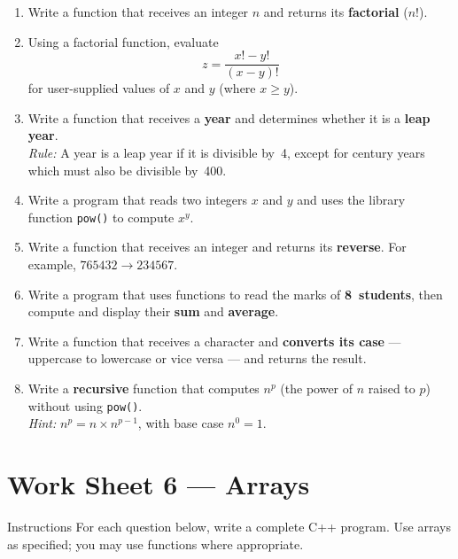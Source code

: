 \begin{enumerate}[leftmargin=*, label=\textbf{Q\arabic*.}]
\item Write a function that receives an integer $n$ and returns its
      \textbf{factorial} ($n!$).

\item Using a factorial function, evaluate
      \[
          z = \frac{x! - y!}{(x - y)!}
      \]
      for user-supplied values of $x$ and $y$ (where $x \geq y$).

\item Write a function that receives a \textbf{year} and determines
      whether it is a \textbf{leap year}.\\
      \textit{Rule:} A year is a leap year if it is divisible by~4,
      except for century years which must also be divisible by~400.

\item Write a program that reads two integers $x$ and $y$ and uses the
      library function \texttt{pow()} to compute $x^{y}$.

\item Write a function that receives an integer and returns its
      \textbf{reverse}.  For example, $765432 \rightarrow 234567$.

\item Write a program that uses functions to read the marks of
      \textbf{8~students}, then compute and display their \textbf{sum}
      and \textbf{average}.

\item Write a function that receives a character and \textbf{converts
      its case} --- uppercase to lowercase or vice versa --- and returns
      the result.

\item Write a \textbf{recursive} function that computes $n^{p}$
      (the power of $n$ raised to $p$) without using
      \texttt{pow()}.\\
      \textit{Hint:} $n^{p} = n \times n^{p-1}$, with base case
      $n^{0} = 1$.

\end{enumerate}

\newpage
\section{Work Sheet 6 --- Arrays}
\label{ws:arrays}

\begin{importantbox}{Instructions}
For each question below, write a complete C++ program.  Use arrays as
specified; you may use functions where appropriate.
\end{importantbox}

